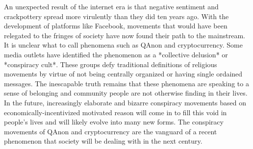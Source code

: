 An unexpected result of the internet era is that negative sentiment and
crackpottery spread more virulently than they did ten years ago. With the
development of platforms like Facebook, movements that would have been relegated
to the fringes of society have now found their path to the mainstream. It is
unclear what to call phenomena such as QAnon and cryptocurrency. Some media
outlets have identified the phenomenon as a *collective delusion* or *conspiracy
cult*. These groups defy traditional definitions of religious movements by
virtue of not being centrally organized or having single ordained messages. The
inescapable truth remains that these phenomena are speaking to a sense of
belonging and community people are not otherwise finding in their lives. In the
future, increasingly elaborate and bizarre conspiracy movements based on
economically-incentivized motivated reason will come in to fill this void in
people's lives and will likely evolve into many new forms. The conspiracy
movements of QAnon and cryptocurrency are the vanguard of a recent phenomenon
that society will be dealing with in the next century.

